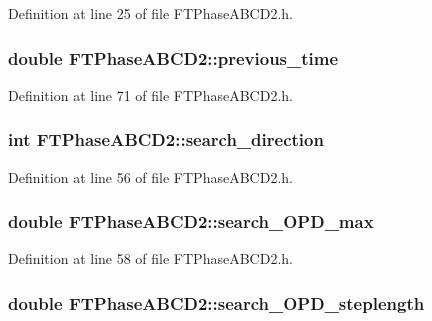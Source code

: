 Definition at line 25 of file FTPhaseABCD2.h.

\hypertarget{classFTPhaseABCD2_a527852fce847c75999c7965fe50b7004}{
\subsubsection[{previous\_\-time}]{\setlength{\rightskip}{0pt plus 5cm}double {\bf FTPhaseABCD2::previous\_\-time}}}
\label{classFTPhaseABCD2_a527852fce847c75999c7965fe50b7004}


Definition at line 71 of file FTPhaseABCD2.h.

\hypertarget{classFTPhaseABCD2_a773a081c902d4d60218c667ae8dfb3fe}{
\subsubsection[{search\_\-direction}]{\setlength{\rightskip}{0pt plus 5cm}int {\bf FTPhaseABCD2::search\_\-direction}}}
\label{classFTPhaseABCD2_a773a081c902d4d60218c667ae8dfb3fe}


Definition at line 56 of file FTPhaseABCD2.h.

\hypertarget{classFTPhaseABCD2_a484c9e4e012a3fc922e7af510f0567db}{
\subsubsection[{search\_\-OPD\_\-max}]{\setlength{\rightskip}{0pt plus 5cm}double {\bf FTPhaseABCD2::search\_\-OPD\_\-max}}}
\label{classFTPhaseABCD2_a484c9e4e012a3fc922e7af510f0567db}


Definition at line 58 of file FTPhaseABCD2.h.

\hypertarget{classFTPhaseABCD2_a24fa4eafbdca00c095adb33dee3eaa4b}{
\subsubsection[{search\_\-OPD\_\-steplength}]{\setlength{\rightskip}{0pt plus 5cm}double {\bf FTPhaseABCD2::search\_\-OPD\_\-steplength}}}
\label{classFTPhaseABCD2_a24fa4eafbdca00c095adb33dee3eaa4b}


